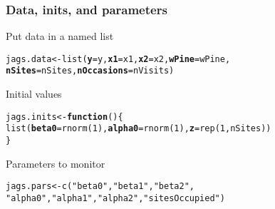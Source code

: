\documentclass[color=usenames,dvipsnames]{beamer}\usepackage[]{graphicx}\usepackage[]{color}
\makeatletter
\newcommand{\hlnum}[1]{\textcolor[rgb]{0.69,0.494,0}{#1}}%
\newcommand{\hlstr}[1]{\textcolor[rgb]{0.749,0.012,0.012}{#1}}%
\newcommand{\hlstd}[1]{\textcolor[rgb]{0,0,0}{#1}}%
\newcommand{\hlkwa}[1]{\textcolor[rgb]{0,0,0}{\textbf{#1}}}%
\newcommand{\hlkwb}[1]{\textcolor[rgb]{0,0.341,0.682}{#1}}%
\newcommand{\hlkwc}[1]{\textcolor[rgb]{0,0,0}{\textbf{#1}}}%
\newcommand{\hlkwd}[1]{\textcolor[rgb]{0.004,0.004,0.506}{#1}}%
\newenvironment{kframe}{%
 \def\at@end@of@kframe{}%
 \ifinner\ifhmode%
  \def\at@end@of@kframe{\end{minipage}}%
  \begin{minipage}{\columnwidth}%
 \fi\fi%
 \def\FrameCommand##1{\hskip\@totalleftmargin \hskip-\fboxsep
 \colorbox{shadecolor}{##1}\hskip-\fboxsep
     \hskip-\linewidth \hskip-\@totalleftmargin \hskip\columnwidth}%
 \MakeFramed {\advance\hsize-\width
   \@totalleftmargin\z@ \linewidth\hsize
   \@setminipage}}%
 {\par\unskip\endMakeFramed%
 \at@end@of@kframe}
\newenvironment{knitrout}{}{} %
\makeatother
\begin{document}
\begin{frame}[fragile]
  \frametitle{Data, inits, and parameters}
  Put data in a named list
  \vspace{-12pt}
\begin{knitrout}\small
{}\color{fgcolor}\begin{kframe}
\begin{alltt}
\hlstd{jags.data} \hlkwb{<-} \hlkwd{list}\hlstd{(}\hlkwc{y}\hlstd{=y,} \hlkwc{x1}\hlstd{=x1,} \hlkwc{x2}\hlstd{=x2,} \hlkwc{wPine}\hlstd{=wPine,}
                  \hlkwc{nSites}\hlstd{=nSites,} \hlkwc{nOccasions}\hlstd{=nVisits)}
\end{alltt}
\end{kframe}
\end{knitrout}
\pause
\vfill
  Initial values
  \vspace{-12pt}
\begin{knitrout}\small
{}\color{fgcolor}\begin{kframe}
\begin{alltt}
\hlstd{jags.inits} \hlkwb{<-} \hlkwa{function}\hlstd{() \{}
    \hlkwd{list}\hlstd{(}\hlkwc{beta0}\hlstd{=}\hlkwd{rnorm}\hlstd{(}\hlnum{1}\hlstd{),} \hlkwc{alpha0}\hlstd{=}\hlkwd{rnorm}\hlstd{(}\hlnum{1}\hlstd{),} \hlkwc{z}\hlstd{=}\hlkwd{rep}\hlstd{(}\hlnum{1}\hlstd{, nSites))}
\hlstd{\}}
\end{alltt}
\end{kframe}
\end{knitrout}
\pause
\vfill
  Parameters to monitor
  \vspace{-12pt}
\begin{knitrout}\small
{}\color{fgcolor}\begin{kframe}
\begin{alltt}
\hlstd{jags.pars} \hlkwb{<-} \hlkwd{c}\hlstd{(}\hlstr{"beta0"}\hlstd{,} \hlstr{"beta1"}\hlstd{,} \hlstr{"beta2"}\hlstd{,}
               \hlstr{"alpha0"}\hlstd{,} \hlstr{"alpha1"}\hlstd{,} \hlstr{"alpha2"}\hlstd{,} \hlstr{"sitesOccupied"}\hlstd{)}
\end{alltt}
\end{kframe}
\end{knitrout}
\end{frame}
\end{document}
